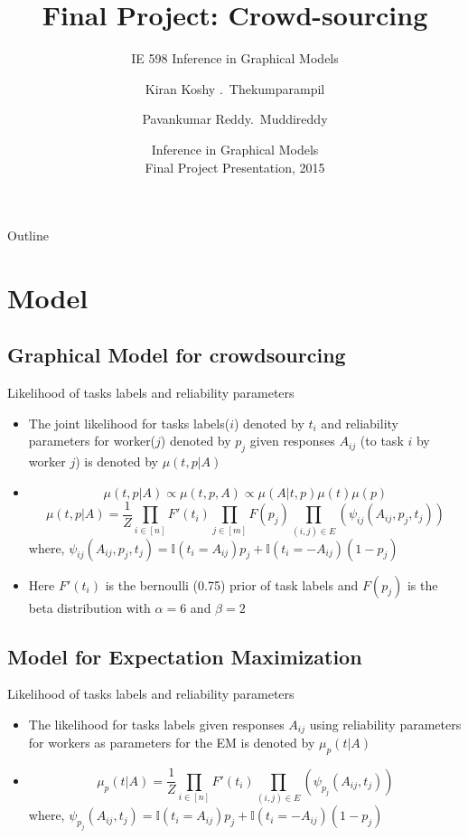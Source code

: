 \documentclass{beamer}
\title{Final Project: Crowd-sourcing}
\subtitle{IE 598 Inference in Graphical Models}
\author{Kiran Koshy .~Thekumparampil\inst{1} \and Pavankumar Reddy.~Muddireddy\inst{1}}
\institute[Universities of Illinois] %
{
  \inst{1}%
  Department of Electrical and Computer Engineering\\
  University of Illinois}
\date{Inference in Graphical Models\\
        Final Project Presentation, 2015}
\begin{document}
\begin{frame}
  \titlepage
\end{frame}

\begin{frame}{Outline}
  \tableofcontents
\end{frame}

\section{Model}

\subsection{Graphical Model for crowdsourcing}

\begin{frame}{Likelihood of tasks labels and reliability parameters}
  \begin{itemize}
  \item {
    The joint likelihood for tasks labels($i$) denoted by $t_i$ and reliability parameters for worker($j$) denoted by $p_j$ given responses $A_{ij}$ (to task $i$ by worker $j$) is denoted by $\mu(t,p|A)$
  }
  \item {
    $$\mu(t,p|A) \propto \mu(t,p,A) \propto \mu(A|t,p)\mu(t)\mu(p)$$
    $$\mu(t,p|A) = \frac{1}{Z}\prod_{i\in [n]}{F'(t_i)}\prod_{j\in [m]}{F(p_j)}\prod_{(i,j)\in E}(\psi_{ij}(A_{ij},p_j,t_j))$$
    where, $\psi_{ij}(A_{ij}, p_j, t_j) = \mathbb{I}(t_i=A_{ij})p_j + \mathbb{I}(t_i=-A_{ij})(1-p_j)$
  }
  \item {
  Here $F'(t_i)$ is the bernoulli (0.75) prior of task labels and $F(p_j)$ is the beta distribution with $\alpha = 6$ and $\beta = 2$
  }
  \end{itemize}
\end{frame}

\subsection{Model for Expectation Maximization}

\begin{frame}{Likelihood of tasks labels and reliability parameters}
  \begin{itemize}
  \item {
    The likelihood for tasks labels given responses $A_{ij}$ using reliability parameters for workers as parameters for the EM is denoted by 
    $\mu_p(t|A)$
  }
  \item {
    $$\mu_p(t|A) = \frac{1}{Z}\prod_{i\in [n]}{F'(t_i)}\prod_{(i,j)\in E}(\psi_{p_j}(A_{ij},t_j))$$
    where, $\psi_{p_j}(A_{ij}, t_j) = \mathbb{I}(t_i=A_{ij})p_j + \mathbb{I}(t_i=-A_{ij})(1-p_j)$
  }
  \end{itemize}
\end{frame}
\end{document}
